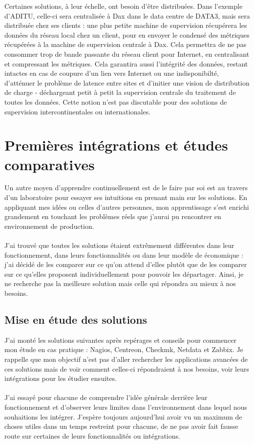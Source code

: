 Certaines solutions, à leur échelle, ont besoin d'être distribuées. Dans l'exemple d'ADITU, celle-ci sera centralisée à Dax dans le data centre de DATA3, mais sera distribuée chez ses clients : une plus petite machine de supervision récupérera les données du réseau local chez un client, pour en envoyer le condensé des métriques récupérées à la machine de supervision centrale à Dax. Cela permettra de ne pas consommer trop de bande passante du réseau client pour Internet, en centralisant et compressant les métriques. Cela garantira aussi l'intégrité des données, restant intactes en cas de coupure d'un lien vers Internet ou une indisponibilté, d'atténuer le problème de latence entre sites et d'initier une vision de distribution de charge - déchargeant petit à petit la supervision centrale du traitement de toutes les données. Cette notion n'est pas discutable pour des solutions de supervision intercontinentales ou internationales.

\section{Premières intégrations et études comparatives}

Un autre moyen d'apprendre continuellement est de le faire par soi est au travers d'un laboratoire pour essayer ses intuitions en prenant main sur les solutions. En appliquant mes idées ou celles d'autres personnes, mon apprentissage s'est enrichi grandement en touchant les problèmes réels que j'aurai pu rencontrer en environnement de production.
\\ \\
J'ai trouvé que toutes les solutions étaient extrêmement différentes dans leur fonctionnement, dans leurs fonctionnalités ou dans leur modèle de économique : j'ai décidé de les comparer sur ce qu'on attend d'elles plutôt que de les comparer sur ce qu'elles proposent individuellement pour pouvoir les départager. Ainsi, je ne recherche pas la meilleure solution mais celle qui répondra au mieux à nos besoins.

\subsection{Mise en étude des solutions}

J'ai monté les solutions suivantes après repérages et conseils pour commencer mon étude en cas pratique : Nagios, Centreon, Checkmk, Netdata et Zabbix. Je rappelle que mon objectif n'est pas d'aller rechercher les applications avancées de ces solutions mais de voir comment celles-ci répondraient à nos besoins, voir leurs intégrations pour les étudier ensuites.
\\ \\
J'ai essayé pour chacune de comprendre l'idée générale derrière leur fonctionnement et d'observer leurs limites dans l'environnement dans lequel nous souhaitions les intégrer. J'espère toujours aujourd'hui avoir vu un maximum de choses utiles dans un temps restreint pour chacune, de ne pas avoir fait fausse route sur certaines de leurs fonctionnalités ou intégrations.

